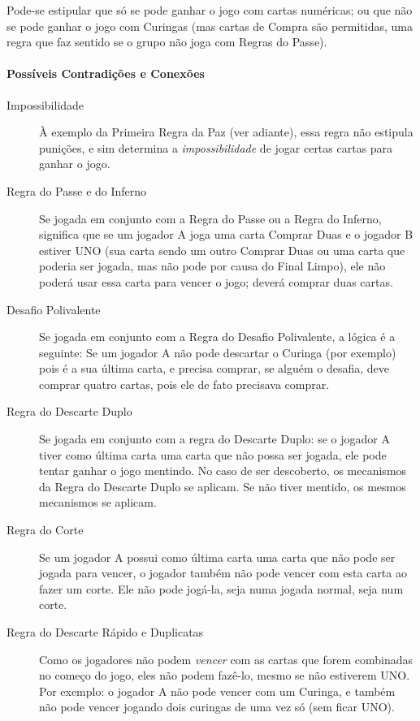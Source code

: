 Pode-se estipular que só se pode ganhar o jogo com cartas numéricas; ou que não se pode ganhar o jogo com Curingas (mas cartas de Compra são permitidas, uma regra que faz sentido se o grupo não joga com Regras do Passe).

\paragraph{Possíveis Contradições e Conexões}

\begin{description}
\item[Impossibilidade]{À exemplo da Primeira Regra da Paz (ver adiante), essa regra não estipula punições, e sim determina a \emph{impossibilidade} de jogar certas cartas para ganhar o jogo.}
\item[Regra do Passe e do Inferno]{Se jogada em conjunto com a Regra do Passe ou a Regra do Inferno, significa que se um jogador A joga uma carta Comprar Duas e o jogador B estiver UNO (sua carta sendo um outro Comprar Duas ou uma carta que poderia ser jogada, mas não pode por causa do Final Limpo), ele não poderá usar essa carta para vencer o jogo; deverá comprar duas cartas.}
\item[Desafio Polivalente]{Se jogada em conjunto com a Regra do Desafio Polivalente, a lógica é a seguinte: Se um jogador A não pode descartar o Curinga (por exemplo) pois é a sua última carta, e precisa comprar, se alguém o desafia, deve comprar quatro cartas, pois ele de fato precisava comprar.}
\item[Regra do Descarte Duplo]{Se jogada em conjunto com a regra do Descarte Duplo: se o jogador A tiver como última carta uma carta que não possa ser jogada, ele pode tentar ganhar o jogo mentindo. No caso de ser descoberto, os mecanismos da Regra do Descarte Duplo se aplicam. Se não tiver mentido, os mesmos mecanismos se aplicam.}
\item[Regra do Corte]{Se um jogador A possui como última carta uma carta que não pode ser jogada para vencer, o jogador também não pode vencer com esta carta ao fazer um corte. Ele não pode jogá-la, seja numa jogada normal, seja num corte.}
\item[Regra do Descarte Rápido e Duplicatas]{Como os jogadores não podem \emph{vencer} com as cartas que forem combinadas no começo do jogo, eles não podem fazê-lo, mesmo se não estiverem UNO. Por exemplo: o jogador A não pode vencer com um Curinga, e também não pode vencer jogando dois curingas de uma vez só (sem ficar UNO).}
\end{description}

